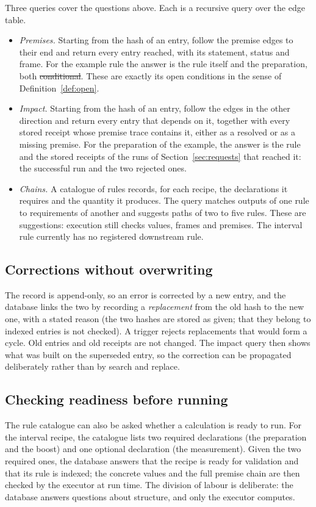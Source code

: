 Three queries cover the questions above. Each is a recursive query over the edge table.
\begin{itemize}[leftmargin=1.5em]
\item \emph{Premises.} Starting from the hash of an entry, follow the premise edges to their end and return every entry reached,
with its statement, status and frame. For the example rule the answer is the rule itself and the preparation, both
\st{conditional}. These are exactly its open conditions in the sense of Definition~\ref{def:open}.
\item \emph{Impact.} Starting from the hash of an entry, follow the edges in the other direction and return every entry that depends
on it, together with every stored receipt whose premise trace contains it, either as a resolved or as a missing premise. For the
preparation of the example, the answer is the rule and the stored receipts of the runs of Section~\ref{sec:requests} that reached it: the successful run and the two rejected ones.
\item \emph{Chains.} A catalogue of rules records, for each recipe, the declarations it requires and the quantity it produces. The
query matches outputs of one rule to requirements of another and suggests paths of two to five rules. These are suggestions: execution
still checks values, frames and premises. The interval rule currently has no registered downstream rule.
\end{itemize}

\subsection{Corrections without overwriting}

The record is append-only, so an error is corrected by a new entry, and the database links the two by recording a \emph{replacement}
from the old hash to the new one, with a stated reason (the two hashes are stored as given; that they belong to indexed entries is not checked). A trigger rejects replacements that would form a cycle. Old entries and old
receipts are not changed. The impact query then shows what was built on the superseded entry, so the correction can be propagated
deliberately rather than by search and replace.

\subsection{Checking readiness before running}

The rule catalogue can also be asked whether a calculation is ready to run. For the interval recipe, the catalogue lists two required
declarations (the preparation and the boost) and one optional declaration (the measurement). Given the two required ones, the database
answers that the recipe is ready for validation and that its rule is indexed; the concrete values and the full premise chain are then
checked by the executor at run time. The division of labour is deliberate: the database answers questions about structure, and only
the executor computes.
